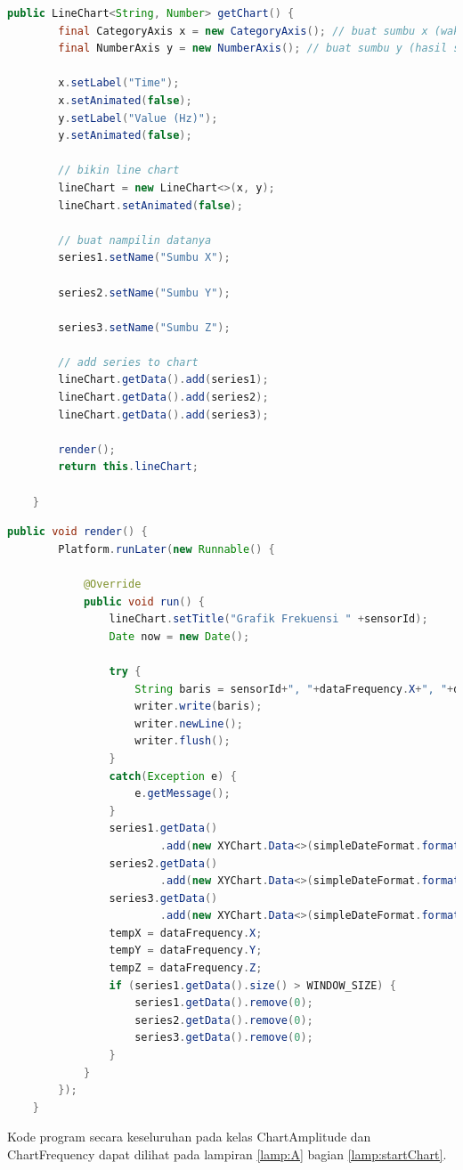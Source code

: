 \begin{lstlisting}[language=Java, caption=Metode getChart() (ChartFrequency), label=getChartFrequency]
    public LineChart<String, Number> getChart() {
        final CategoryAxis x = new CategoryAxis(); // buat sumbu x (waktu)
        final NumberAxis y = new NumberAxis(); // buat sumbu y (hasil sensor)

        x.setLabel("Time");
        x.setAnimated(false);
        y.setLabel("Value (Hz)");
        y.setAnimated(false);

        // bikin line chart
        lineChart = new LineChart<>(x, y);
        lineChart.setAnimated(false);

        // buat nampilin datanya
        series1.setName("Sumbu X");

        series2.setName("Sumbu Y");

        series3.setName("Sumbu Z");

        // add series to chart
        lineChart.getData().add(series1);
        lineChart.getData().add(series2);
        lineChart.getData().add(series3);

        render();
        return this.lineChart;

    }
\end{lstlisting}

\begin{lstlisting}[language=Java, caption=Metode render() (ChartFrequency), label=renderFrequency]
    public void render() {
    	Platform.runLater(new Runnable() {
			
			@Override
			public void run() {
				lineChart.setTitle("Grafik Frekuensi " +sensorId);
		        Date now = new Date();
		        
		        try {
					String baris = sensorId+", "+dataFrequency.X+", "+dataFrequency.Y+", "+dataFrequency.Z;
					writer.write(baris);
					writer.newLine();
					writer.flush();
				}
				catch(Exception e) {
					e.getMessage();
				}
		        series1.getData()
		                .add(new XYChart.Data<>(simpleDateFormat.format(now), dataFrequency.X));
		        series2.getData()
		                .add(new XYChart.Data<>(simpleDateFormat.format(now), dataFrequency.Y));
		        series3.getData()
		                .add(new XYChart.Data<>(simpleDateFormat.format(now), dataFrequency.Z));
		        tempX = dataFrequency.X;
		        tempY = dataFrequency.Y;
		        tempZ = dataFrequency.Z;
		        if (series1.getData().size() > WINDOW_SIZE) {
		            series1.getData().remove(0);
		            series2.getData().remove(0);
		            series3.getData().remove(0);
		        }
			}
		});
    }
\end{lstlisting}
Kode program secara keseluruhan pada kelas ChartAmplitude dan ChartFrequency dapat dilihat pada lampiran \ref{lamp:A} bagian \ref{lamp:startChart}.

